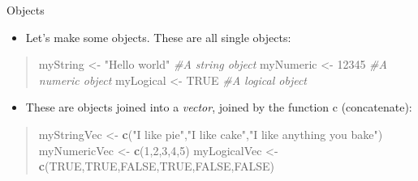 \documentclass[
  ignorenonframetext,
  aspectratio=169]{beamer}
\newenvironment{Shaded}{\begin{snugshade}}{\end{snugshade}}
\newcommand{\CommentTok}[1]{\textcolor[rgb]{0.56,0.35,0.01}{\textit{#1}}}
\newcommand{\ConstantTok}[1]{\textcolor[rgb]{0.56,0.35,0.01}{#1}}
\newcommand{\DecValTok}[1]{\textcolor[rgb]{0.00,0.00,0.81}{#1}}
\newcommand{\FunctionTok}[1]{\textcolor[rgb]{0.13,0.29,0.53}{\textbf{#1}}}
\newcommand{\NormalTok}[1]{#1}
\newcommand{\OtherTok}[1]{\textcolor[rgb]{0.56,0.35,0.01}{#1}}
\newcommand{\StringTok}[1]{\textcolor[rgb]{0.31,0.60,0.02}{#1}}
\providecommand{\tightlist}{%
  \setlength{\itemsep}{0pt}\setlength{\parskip}{0pt}}
\begin{document}
\begin{frame}[fragile]{Objects}
\protect\hypertarget{objects}{}
\begin{itemize}
\tightlist
\item
  Let's make some objects. These are all single objects:
\end{itemize}

\footnotesize

\begin{quote}
\begin{Shaded}
\begin{Highlighting}[]
\NormalTok{myString }\OtherTok{\textless{}{-}} \StringTok{"Hello world"} \CommentTok{\#A string object}
\NormalTok{myNumeric }\OtherTok{\textless{}{-}} \DecValTok{12345} \CommentTok{\#A numeric object}
\NormalTok{myLogical }\OtherTok{\textless{}{-}} \ConstantTok{TRUE} \CommentTok{\#A logical object}
\end{Highlighting}
\end{Shaded}
\end{quote}

\normalsize

\begin{itemize}
\tightlist
\item
  These are objects joined into a \emph{vector}, joined by the function
  c (concatenate):
\end{itemize}

\footnotesize

\begin{quote}
\begin{Shaded}
\begin{Highlighting}[]
\NormalTok{myStringVec }\OtherTok{\textless{}{-}} \FunctionTok{c}\NormalTok{(}\StringTok{"I like pie"}\NormalTok{,}\StringTok{"I like cake"}\NormalTok{,}\StringTok{"I like anything you bake"}\NormalTok{)}
\NormalTok{myNumericVec }\OtherTok{\textless{}{-}} \FunctionTok{c}\NormalTok{(}\DecValTok{1}\NormalTok{,}\DecValTok{2}\NormalTok{,}\DecValTok{3}\NormalTok{,}\DecValTok{4}\NormalTok{,}\DecValTok{5}\NormalTok{)}
\NormalTok{myLogicalVec }\OtherTok{\textless{}{-}} \FunctionTok{c}\NormalTok{(}\ConstantTok{TRUE}\NormalTok{,}\ConstantTok{TRUE}\NormalTok{,}\ConstantTok{FALSE}\NormalTok{,}\ConstantTok{TRUE}\NormalTok{,}\ConstantTok{FALSE}\NormalTok{,}\ConstantTok{FALSE}\NormalTok{)}
\end{Highlighting}
\end{Shaded}
\end{quote}

\normalsize


\end{frame}
\end{document}
